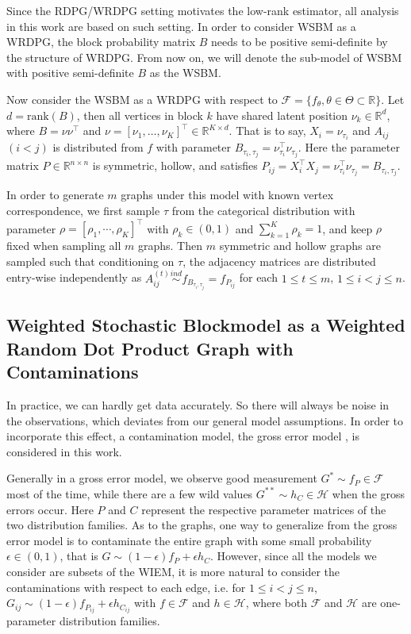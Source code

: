 \documentclass[a4paper]{article}
\begin{document}
Since the RDPG/WRDPG setting motivates the low-rank estimator, all analysis in this work are based on such setting. In order to consider WSBM as a WRDPG, the block probability matrix $B$ needs to be positive semi-definite by the structure of WRDPG. From now on, we will denote the sub-model of WSBM with positive semi-definite $B$ as the WSBM.

Now consider the WSBM as a WRDPG with respect to $\mathcal{F} = \{ f_{\theta}, \theta \in \Theta \subset \mathbb{R} \}$. Let $d = 
\mathrm{rank}(B)$, then all vertices in block $k$ have shared latent position $\nu_k \in \mathbb{R}^{d}$, where $B = \nu \nu^{\top}$ and $\nu = [\nu_1, \dotsc, \nu_K]^{\top} \in \mathbb{R}^{K \times d}$. That is to say, $X_i = \nu_{\tau_i}$ and $A_{ij}$ $(i < j)$ is distributed from $f$ with parameter $B_{\tau_i, \tau_j} = \nu_{\tau_i}^{\top} \nu_{\tau_j}$. Here the parameter matrix $P \in \mathbb{R}^{n \times n}$ is symmetric, hollow, and satisfies $P_{ij} = X_i^{\top} X_j = \nu_{\tau_i}^{\top} \nu_{\tau_j} = B_{\tau_i, \tau_j}$.

In order to generate $m$ graphs under this model with known vertex correspondence, we first sample $\tau$ from the categorical distribution with parameter $\rho = [\rho_1, \cdots, \rho_K]^{\top}$ with $\rho_k \in (0, 1)$ and $\sum_{k = 1}^{K} \rho_k = 1$, and keep $\rho$ fixed when sampling all $m$ graphs. Then $m$ symmetric and hollow graphs are sampled such that conditioning on $\tau$, the adjacency matrices are distributed entry-wise independently as $A^{(t)}_{ij} \stackrel{ind}{\sim} f_{B_{\tau_i, \tau_j}} = f_{P_{ij}}$ for each $1 \le t \le m$, $1 \le i < j \le n$.




\subsection{Weighted Stochastic Blockmodel as a Weighted Random Dot Product Graph with Contaminations}
\label{section:Contamination}

In practice, we can hardly get data accurately. So there will always be noise in the observations, which deviates from our general model assumptions. In order to incorporate this effect, a contamination model, the gross error model \citep{AIC:AIC690280519, bickel2001mathematical}, is considered in this work.

Generally in a gross error model, we observe good measurement $G^* \sim f_P \in \mathcal{F}$ most of the time, while there are a few wild values $G^{**} \sim h_C \in \mathcal{H}$ when the gross errors occur. Here $P$ and $C$ represent the respective parameter matrices of the two distribution families.
As to the graphs, one way to generalize from the gross error model is to contaminate the entire graph with some small probability $\epsilon \in (0, 1)$, that is $G \sim (1-\epsilon) f_P + \epsilon h_C$. However, since all the models we consider are subsets of the WIEM, it is more natural to consider the contaminations with respect to each edge, i.e. for $1 \le i <  j \le n$, $G_{ij} \sim (1-\epsilon) f_{P_{ij}} + \epsilon h_{C_{ij}}$ with $f \in \mathcal{F}$ and $h \in \mathcal{H}$, where both $\mathcal{F}$ and $\mathcal{H}$ are one-parameter distribution families.
\end{document}
